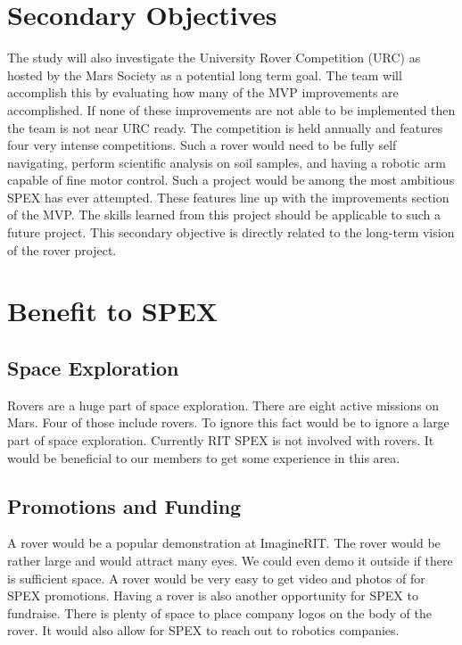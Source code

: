 \documentclass[conference]{IEEEtran} %
\begin{document}
\section{Secondary Objectives}
\label{sec:secondary-obj}
The study will also investigate the University Rover Competition (URC) as hosted by the Mars Society as a potential long term goal. 
The team will accomplish this by evaluating how many of the MVP improvements are accomplished. 
If none of these improvements are not able to be implemented then the team is not near URC ready.
The competition is held annually and features four very intense competitions. 
Such a rover would need to be fully self navigating, perform scientific analysis on soil samples, and having a robotic arm capable of fine motor control. 
Such a project would be among the most ambitious SPEX has ever attempted. 
These features line up with the improvements section of the MVP.
The skills learned from this project should be applicable to such a future project. 
This secondary objective is directly related to the long-term vision of the rover project. 

\section{Benefit to SPEX}
\label{sec:benefit}

\subsection{Space Exploration}
Rovers are a huge part of space exploration. 
There are eight active missions on Mars. 
Four of those include rovers. 
To ignore this fact would be to ignore a large part of space exploration.
Currently RIT SPEX is not involved with rovers.
It would be beneficial to our members to get some experience in this area.

\subsection{Promotions and Funding}
A rover would be a popular demonstration at ImagineRIT.
The rover would be rather large and would attract many eyes. 
We could even demo it outside if there is sufficient space. 
A rover would be very easy to get video and photos of for SPEX promotions. 
Having a rover is also another opportunity for SPEX to fundraise. 
There is plenty of space to place company logos on the body of the rover. 
It would also allow for SPEX to reach out to robotics companies.
\end{document}
